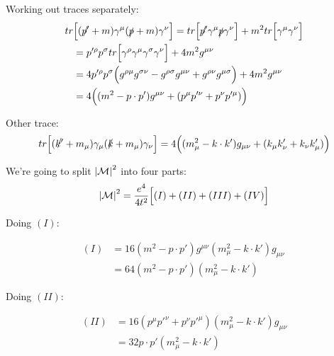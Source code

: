 \documentclass[11pt]{article}
\begin{document}
Working out traces separately:
\begin{equation}
  \begin{split}
    tr & \Big[ (\slashed{p'} + m) \gamma^\mu
      (\slashed{p} + m) \gamma^\nu \Big] =
    tr \Big[ \slashed{p'} \gamma^\mu \slashed{p} \gamma^\nu \Big] +
    m^2 tr \Big[ \gamma^\mu \gamma^\nu \Big] \\
    & = p'^\rho p^\sigma tr \Big [
      \gamma^\rho \gamma^\mu \gamma^\sigma \gamma^\nu \Big ] +
    4 m^2 g^{\mu\nu} \\
    & = 4 p'^\rho p^\sigma \Big ( g^{\rho \mu} g^{\sigma \nu} - 
      g^{\rho \sigma} g^{\mu \nu} + g^{\rho \nu} g^{\mu \sigma} \Big ) +
      4 m^2 g^{\mu \nu} \\
    & = 4 \Big ( (m^2 - p \cdot p') g^{\mu \nu} +
      (p^\mu p'^\nu + p^\nu p'^\mu) \Big )
  \end{split}
\end{equation}

Other trace:
\begin{equation}
    tr \Big[ (\slashed{k'} + m_\mu) \gamma_\mu
      (\slashed{k} + m_\mu) \gamma_\nu \Big] =
      4 \Big ( (m_\mu^2 - k \cdot k') g_{\mu \nu} +
                   (k_\mu k'_\nu + k_\nu k'_\mu) \Big )
\end{equation}

We're going to split ${|\cal{M}|}^2$ into four parts:
\begin{equation}
  {|\cal{M}|}^2 = \frac{e^4}{4t^2} \Big [ (I) + (II) + (III) + (IV) \Big ]
\end{equation}

Doing $(I)$:

\begin{equation}
  \begin{split}
    (I) & = 16 (m^2 - p \cdot p') g^{\mu \nu} (m_\mu^2 - k \cdot k')
      g_{\mu \nu} \ \\
    & = 64 (m^2 - p \cdot p') (m_\mu^2 - k \cdot k')
  \end{split}
\end{equation}

Doing $(II)$:

\begin{equation}
  \begin{split}
    (II) & = 16 (p^\mu p'^\nu + p^\nu p'^\mu) (m_\mu^2 - k \cdot k')
      g_{\mu \nu} \\
    & = 32 p \cdot p' (m_\mu^2 - k \cdot k')
  \end{split}
\end{equation}
\end{document}
